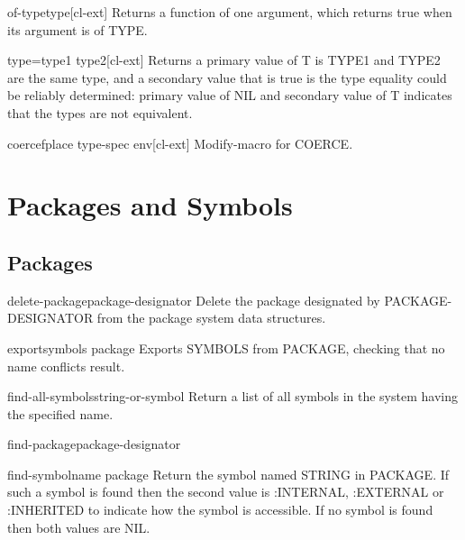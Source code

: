 \documentclass[10pt,english]{book}
\begin{document}
\begin{function}{of-type}{type}[cl-ext]
  Returns a function of one argument, which returns true when its argument is
of TYPE.
\end{function}

\begin{function}{type=}{type1 type2}[cl-ext]
  Returns a primary value of T is TYPE1 and TYPE2 are the same type,
and a secondary value that is true is the type equality could be reliably
determined: primary value of NIL and secondary value of T indicates that the
types are not equivalent.
\end{function}

\begin{macro}{coercef}{place type-spec \env env}[cl-ext]
  Modify-macro for COERCE.
\end{macro}



\chapter{Packages and Symbols}

\section{Packages}

\begin{function}{delete-package}{package-designator}
  Delete the package designated by PACKAGE-DESIGNATOR from the package
  system data structures.
\end{function}

\begin{function}{export}{symbols \op package}
  Exports SYMBOLS from PACKAGE, checking that no name conflicts result.
\end{function}

\begin{function}{find-all-symbols}{string-or-symbol}
  Return a list of all symbols in the system having the specified name.
\end{function}

\begin{function}{find-package}{package-designator}
  
\end{function}

\begin{function}{find-symbol}{name \op package}
  Return the symbol named STRING in PACKAGE. If such a symbol is found
  then the second value is :INTERNAL, :EXTERNAL or :INHERITED to indicate
  how the symbol is accessible. If no symbol is found then both values
  are NIL.
\end{function}
\end{document}
